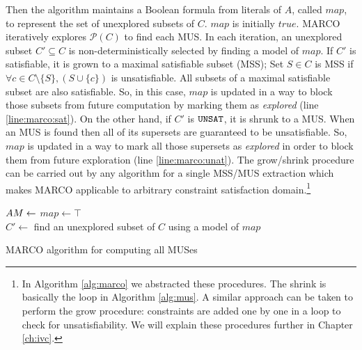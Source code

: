 Then the algorithm maintains a Boolean formula from literals of $A$, called $map$, to represent the set
of unexplored subsets of $C$.  $map$ is initially $true$.
MARCO iteratively explores $\mathcal{P} (C)$ to find each MUS. In each iteration, an unexplored subset $C' \subseteq C$ is non-deterministically selected by finding
a model of $map$. If $C'$ is satisfiable, it is grown
to a maximal satisfiable subset (MSS); Set $S \in C$ is MSS if $\forall c \in C \setminus \{S\}, (S \cup \{c\})$ is unsatisfiable. All subsets of a maximal satisfiable subset are also satisfiable. So, in this case, $map$ is updated in a way to block those subsets from future computation by marking them as \emph{explored} (line \ref{line:marco:sat}).
On the other hand, if $C'$ is $\texttt{UNSAT}$, it is shrunk to a MUS.
When an MUS is found then all of its supersets are guaranteed to be unsatisfiable. So, $map$ is updated in a way
to mark all those supersets as \emph{explored} in order to block them from future exploration (line \ref{line:marco:unat}).
The grow/shrink procedure can be carried out by any algorithm for
a single MSS/MUS extraction which makes MARCO applicable to arbitrary
constraint satisfaction domain.\footnote{In Algorithm \ref{alg:marco} we abstracted these procedures. The shrink is basically the loop in Algorithm \ref{alg:mus}. A similar approach can be taken to perform the grow procedure: constraints are added one by one in a loop to check for unsatisfiability. We will explain these procedures further in Chapter \ref{ch:ivc}.}

\begin{algorithm}[t]
  \BlankLine
  $AM \leftarrow \empty$
  $map \leftarrow \top$ \\
     {
   $C' \leftarrow$ find an unexplored subset of $C$ using a model of $map$
  }
\caption{MARCO algorithm for computing all MUSes}
\label{alg:marco}
\end{algorithm}


